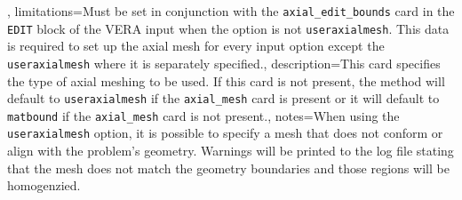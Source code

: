{{\begin{itemize}
       \end{itemize}},
     limitations={Must be set in conjunction with the \texttt{axial\_edit\_bounds}     %
       card in the \texttt{EDIT} block of the VERA input when the option is not        %
       \texttt{useraxialmesh}. This data is required to set up the axial mesh for      %
       every input option except the \texttt{useraxialmesh} where it is separately     %
       specified.},
     description={This card specifies the type of axial meshing to be used.            %
       If this card is not present, the method will default to \texttt{useraxialmesh}  %
       if the \texttt{axial\_mesh} card is present or it will default to               %
       \texttt{matbound} if the \texttt{axial\_mesh} card is not present.},
     notes={When using the \texttt{useraxialmesh} option, it is possible to            %
       specify a mesh that does not conform or align with the problem's                %
       geometry.  Warnings will be printed to the log file stating that the            %
       mesh does not match the geometry boundaries and those regions will be           %
       homogenzied.}
   }

